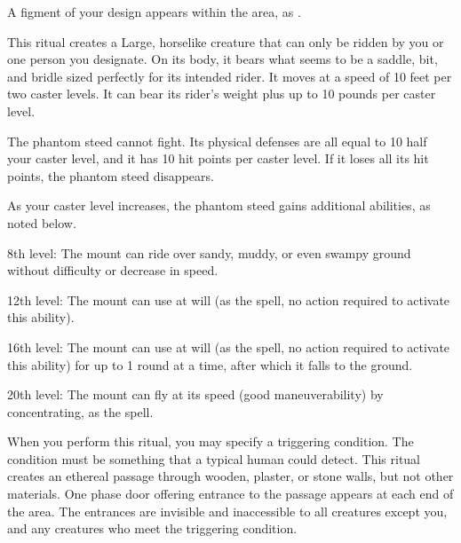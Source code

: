 \spellline
\spelleffect A figment of your design appears within the area, as .

\spellrng{\rngclose}
\spelldur{\durext \dismissable}
\spellline
\spelleffect This ritual creates a Large, horselike creature that can only be ridden by you or one person you designate. On its body, it bears what seems to be a saddle, bit, and bridle sized perfectly for its intended rider. 
It moves at a speed of 10 feet per two caster levels. It can bear its rider's weight plus up to 10 pounds per caster level.

The phantom steed cannot fight. Its physical defenses are all equal to 10 \add half your caster level, and it has 10 hit points  per caster level. If it loses all its hit points, the phantom steed disappears.

\par As your caster level increases, the phantom steed gains additional abilities, as noted below.

\par 8th level: The mount can ride over sandy, muddy, or even swampy ground without difficulty or decrease in speed.

\par 12th level: The mount can use  at will (as the spell, no action required to activate this ability).

\par 16th level: The mount can use  at will (as the spell, no action required to activate this ability) for up to 1 round at a time, after which it falls to the ground.

\par 20th level: The mount can fly at its speed (good maneuverability) by concentrating, as the  spell.

\spellspecial When you perform this ritual, you may specify a triggering condition. The condition must be something that a typical human could detect.
\spellline
\spelleffect This ritual creates an ethereal passage through wooden, plaster, or stone walls, but not other materials. One phase door offering entrance to the passage appears at each end of the area. The entrances are invisible and inaccessible to all creatures except you, and any creatures who meet the triggering condition.

